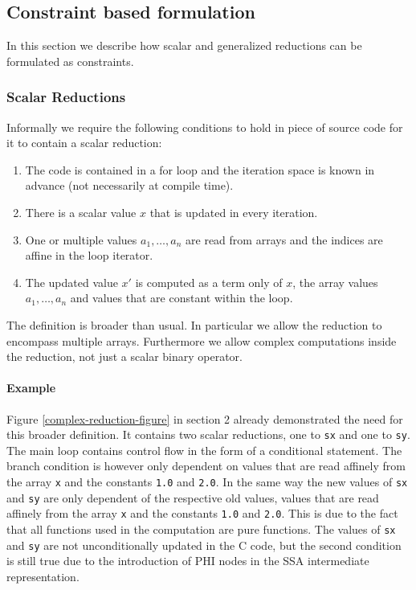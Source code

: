 \subsection{Constraint based formulation}
In this section we describe how scalar and generalized reductions can be formulated as constraints.
\subsubsection{Scalar Reductions}
Informally  we require the following conditions to hold in piece of source code for it to contain a scalar reduction:
\begin{enumerate}
\item The code is contained in a for loop and the iteration space is known in advance (not necessarily at compile time).
\item There is a scalar value $x$ that is updated in every iteration.
\item One or multiple values $a_1,\dots,a_n$ are read from arrays and the indices are affine in the loop iterator.
\item The updated value $x'$ is computed as a term only of $x$, the array values $a_1,\dots,a_n$ and values that are constant within the loop.
\end{enumerate}

The definition is broader than usual.  In particular we allow the
reduction to encompass multiple arrays.  Furthermore we allow complex
computations inside the reduction, not just a scalar binary operator.

\paragraph{Example}
Figure \ref{complex-reduction-figure} in section 2 already  demonstrated the 
need for this broader definition.
It contains two scalar reductions, one to \texttt{sx} and one to \texttt{sy}.
The main loop contains control flow in the form of a conditional statement.
The branch condition is however only dependent on values that are read affinely from the array \texttt{x} and the constants \texttt{1.0} and \texttt{2.0}.
In the same way the new values of \texttt{sx} and \texttt{sy} are only dependent of the respective old values, values that are read affinely from the array \texttt{x} and the constants \texttt{1.0} and \texttt{2.0}.
This is due to the fact that all functions used in the computation are pure functions.
The values of \texttt{sx} and \texttt{sy} are not unconditionally updated in the C code, but the second condition is still true due to the introduction of PHI nodes in the SSA intermediate representation.

